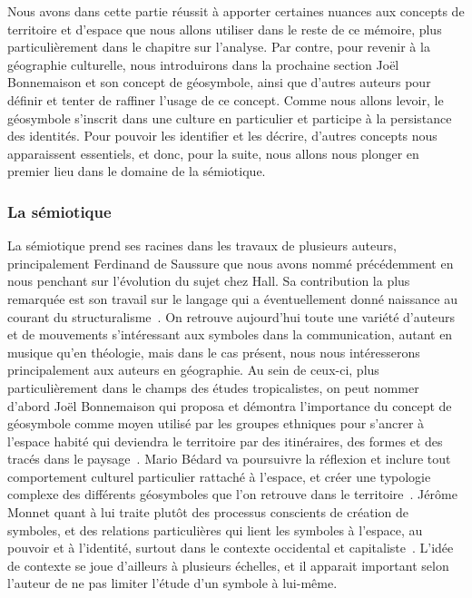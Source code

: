 Nous avons dans cette partie réussit à apporter certaines nuances aux concepts de territoire et d'espace que nous allons utiliser dans le reste de ce mémoire, plus particulièrement dans le chapitre sur l'analyse.
Par contre, pour revenir à la géographie culturelle, nous introduirons dans la prochaine section Joël Bonnemaison et son concept de géosymbole, ainsi que d'autres auteurs pour définir et tenter de raffiner l'usage de ce concept.
Comme nous allons levoir, le géosymbole s'inscrit dans une culture en particulier et participe à la persistance des identités. 
Pour pouvoir les identifier et les décrire, d'autres concepts nous apparaissent essentiels, et donc, pour la suite, nous allons nous plonger en premier lieu dans le domaine de la sémiotique.

\subsubsection{La sémiotique}
\label{ssub:la_semiotique}  La sémiotique prend ses racines dans les travaux de plusieurs auteurs, principalement Ferdinand de Saussure que nous avons nommé précédemment en nous penchant sur l'évolution du sujet chez Hall.
Sa contribution la plus remarquée est son travail sur le langage qui a éventuellement donné naissance au courant du structuralisme~\citep{Noth1995}.
On retrouve aujourd'hui toute une variété d'auteurs et de mouvements s'intéressant aux symboles dans la communication, autant en musique qu'en théologie, mais dans le cas présent, nous nous intéresserons principalement aux auteurs en géographie.
Au sein de ceux-ci, plus particulièrement dans le champs des études tropicalistes, on peut nommer d'abord Joël Bonnemaison qui proposa et démontra l'importance du concept de géosymbole comme moyen utilisé par les groupes ethniques pour s'ancrer à l'espace habité qui deviendra le territoire par des itinéraires, des formes et des tracés dans le paysage~\citep{Bonnemaison1981}.
Mario Bédard va poursuivre la réflexion et inclure tout comportement culturel particulier rattaché à l'espace, et créer une typologie complexe des différents géosymboles que l'on retrouve dans le territoire~\citep{Bedard2002}.
Jérôme Monnet quant à lui traite plutôt des processus conscients de création de symboles, et des relations particulières qui lient les symboles à l'espace, au pouvoir et à l'identité, surtout dans le contexte occidental et capitaliste~\citep{Monnet1998}.
L'idée de contexte se joue d'ailleurs à plusieurs échelles, et il apparait important selon l'auteur de ne pas limiter l'étude d'un symbole à lui-même.
